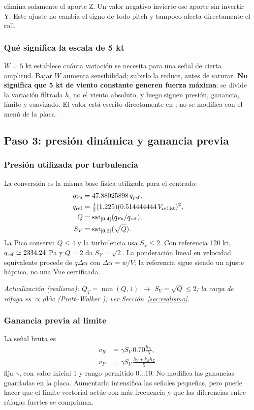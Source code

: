  elimina solamente el aporte Z. Un valor negativo invierte ese aporte sin invertir Y. Este ajuste no cambia el signo de todo pitch y tampoco afecta directamente el roll.

\subsubsection{Qué significa la escala de 5 kt}
$W=5$ kt establece cuánta variación se necesita para una señal de cierta amplitud. Bajar $W$ aumenta sensibilidad; subirlo la reduce, antes de saturar. \textbf{No significa que 5 kt de viento constante generen fuerza máxima}: se divide la variación filtrada $h$, no el viento absoluto, y luego siguen presión, ganancia, límite y suavizado. El valor está escrito directamente en ; no se modifica con el menú de la placa.

\subsection{Paso 3: presión dinámica y ganancia previa}
\subsubsection{Presión utilizada por turbulencia}
La conversión es la misma base física utilizada para el centrado:
\begin{align}
q_{\rm Pa}&=47.88025898\,q_{\rm psf},\\
q_{\rm ref}&=\tfrac12(1.225)(0.514444444\,V_{\rm ref,kt})^2,\\
Q&=\operatorname{sat}_{[0,4]}(q_{\rm Pa}/q_{\rm ref}),\\
S_V&=\operatorname{sat}_{[0,2]}(\sqrt Q).
\label{eq:turb-q}
\end{align}
La Pico conserva $Q\le4$ y la turbulencia usa $S_V\le2$. Con referencia 120 kt, $q_{\rm ref}\simeq2334.24$ Pa y $Q=2$ da $S_V=\sqrt2$. La ponderación lineal en velocidad equivalente procede de $q\Delta\alpha$ con $\Delta\alpha=w/V$; la referencia sigue siendo un ajuste háptico, no una Vne certificada.

\textit{Actualización (realismo): $Q_T=\min(Q,1)$ $\rightarrow$ $S_V=\sqrt Q\le2$; la carga de ráfaga es $\propto\rho Vw$ (Pratt--Walker \cite{pratt1954}); ver Sección~\ref{sec:realismo}.}

\subsubsection{Ganancia previa al límite}
La señal bruta es
\begin{align}
v_R&=\gamma S_V\,0.70\frac{h_X}{5},\\
v_P&=\gamma S_V\,\frac{h_Y+k_Zh_Z}{5}.
\label{eq:turb-raw}
\end{align}
 fija $\gamma$, con valor inicial 1 y rango permitido $0\ldots10$. No modifica las ganancias guardadas en la placa. Aumentarla intensifica las señales pequeñas, pero puede hacer que el límite vectorial actúe con más frecuencia y que las diferencias entre ráfagas fuertes se compriman.

